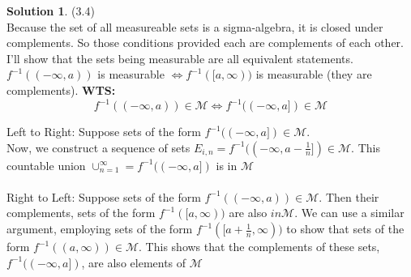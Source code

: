 \documentclass[letterpaper,12pt]{article}
\theoremstyle{definition}
\newtheorem{solution}[theorem]{Solution}
\begin{document}
\begin{solution}{(3.4)} \\
Because the set of all measureable sets is a sigma-algebra, it is closed under complements. So those conditions provided each are complements of each other. \\
I'll show that the sets being measurable are all equivalent statements. \\
$f^{-1}((-\infty, a))$ is measurable $\iff f^{-1}([a, \infty))$ is measurable (they are complements). \textbf{WTS:}
$$ f^{-1}((-\infty, a)) \in \mathcal{M} \iff f^{-1}((-\infty, a]) \in \mathcal{M} $$

Left to Right: Suppose sets of the form $f^{-1}((-\infty, a]) \in \mathcal{M}$. \\
Now, we construct a sequence of sets $E_{i,n} = f^{-1}((-\infty, a - \frac{1}{n}]) \in \mathcal{M} $. This countable union $\cup_{n=1}^\infty = f^{-1}((-\infty, a])$ is in $\mathcal{M}$ \\~\\
Right to Left: Suppose sets of the form $f^{-1}((-\infty, a)) \in \mathcal{M}$. Then their complements, sets of the form $f^{-1} ([a, \infty))$ are also $in \mathcal{M}$. We can use a similar argument, employing sets of the form $f^{-1}([ a + \frac{1}{n}, \infty))$ to show that sets of the form $f^{-1}((a, \infty)) \in \mathcal{M}$. This shows that the complements of these sets, $f^{-1}((-\infty, a])$, are also elements of $\mathcal{M}$ \\
\end{solution}
\end{document}
